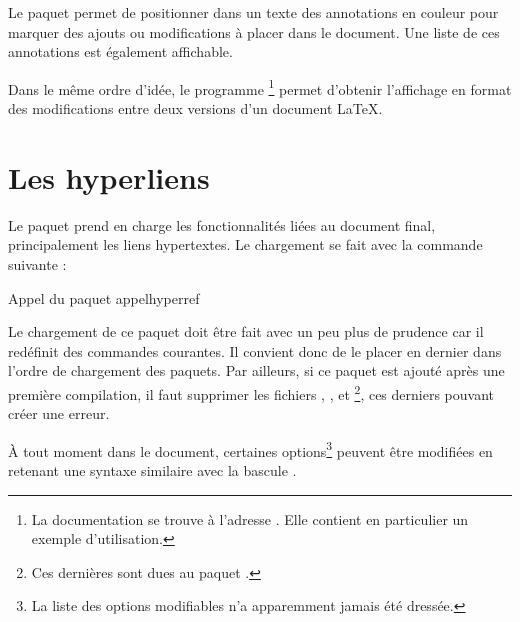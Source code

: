 Le paquet  permet de positionner dans un texte des annotations en couleur pour marquer des ajouts ou modifications à placer dans le document. Une liste de ces annotations est également affichable.

Dans le même ordre d'idée, le programme \footnote{La documentation se trouve à l'adresse . Elle contient en particulier un exemple d'utilisation.} permet d'obtenir l'affichage en format  des modifications entre deux versions d'un document \LaTeX.

\section{Les hyperliens}

Le paquet  prend en charge les fonctionnalités liées au document  final, principalement les liens hypertextes. Le chargement se fait avec la  commande suivante : \begin{codesimple}{Appel du paquet }{appelhyperref}
\usepackage[§oc£¤options§fc]{hyperref}
\end{codesimple}

Le chargement de ce paquet doit être fait avec un peu plus de prudence car il redéfinit des commandes courantes. Il convient donc de le placer en dernier dans l'ordre de chargement des paquets. Par ailleurs, si ce paquet est ajouté après une première compilation, il faut supprimer les fichiers , ,  et \footnote{Ces dernières sont dues au paquet .}, ces derniers pouvant créer une erreur.

\`{A} tout moment dans le document, certaines options\footnote{La liste des options modifiables n'a apparemment jamais été dressée.} peuvent être modifiées en retenant une syntaxe similaire avec la bascule .

